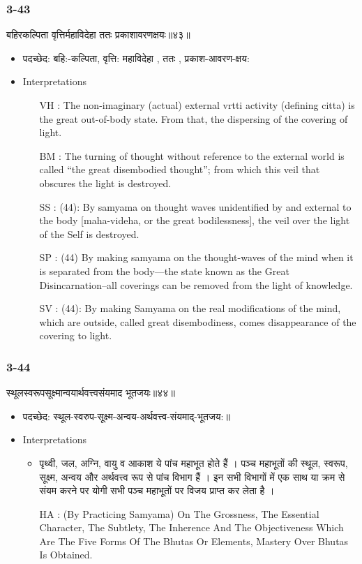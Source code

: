 \begin{frame}[fragile]\frametitle{3-43}
\begin{sanskrit}
बहिरकल्पिता वृत्तिर्महाविदेहा ततः प्रकाशावरणक्षयः॥४३॥
\end{sanskrit}

	\begin{itemize}
	\item पदच्छेद: बहि:-कल्पिता, वृत्ति: महाविदेहा , ततः , प्रकाश-आवरण-क्षय:
	\item Interpretations
		\begin{itemize}	
		\item [VH]: The non-imaginary (actual) external vrtti activity (defining citta) is the great out-of-body state. From that, the dispersing of the covering of light.
		\item [BM]: The turning of thought without reference to the external world is called “the great disembodied thought”; from which this veil that obscures the light is destroyed.
		\item [SS]: (44): By samyama on thought waves unidentified by and external to the body [maha-videha, or the great bodilessness], the veil over the light of the Self is destroyed.
		\item [SP]: (44) By making samyama on the thought-waves of the mind when it is separated from the body—the state known as the Great Disincarnation–all coverings can be removed from the light of knowledge.
		\item [SV]: (44): By making Samyama on the real modifications of the mind, which are outside, called great disembodiness, comes disappearance of the covering to light. 
		\end{itemize}
	\end{itemize}
\end{frame}



\begin{frame}[fragile]\frametitle{3-44}
\begin{sanskrit}
स्थूलस्वरूपसूक्ष्मान्वयार्थवत्त्वसंयमाद भूतजयः॥४४॥
\end{sanskrit}

	\begin{itemize}
	\item पदच्छेद:  स्थूल-स्वरुप-सूक्ष्म-अन्वय-अर्थवत्त्व-‌संयमाद्-भूतजय:॥
	\item Interpretations
		\begin{itemize}	
		\item पृथ्वी, जल, अग्नि, वायु व आकाश ये पांच महाभूत होते हैं । पञ्च महाभूतों की स्थूल, स्वरूप, सूक्ष्म, अन्वय और अर्थवत्त्व रूप से पांच विभाग हैं । इन सभी विभागों में एक साथ या क्रम से संयम करने पर योगी सभी पञ्च महाभूतों पर विजय प्राप्त कर लेता है ।
		\item [HA]: (By Practicing Samyama) On The Grossness, The Essential Character, The Subtlety, The Inherence And The Objectiveness Which Are The Five Forms Of The Bhutas Or Elements, Mastery Over Bhutas Is Obtained.
		\end{itemize}
	\end{itemize}
\end{frame}

